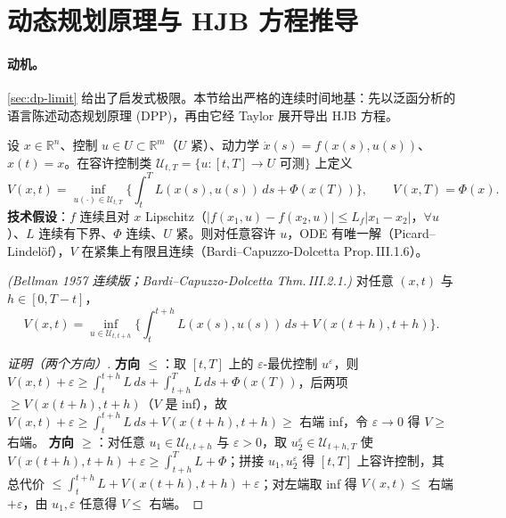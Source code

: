 \section{动态规划原理与 HJB 方程推导}
\label{sec:dp-hjb-derive}

\paragraph{动机。}
\cref{sec:dp-limit} 给出了启发式极限。本节给出严格的连续时间地基：先以泛函分析的语言陈述动态规划原理 (DPP)，再由它经 Taylor 展开导出 HJB 方程。

\begin{definition}\label{def:dp-bolza}
设 $x\in\mathbb R^n$、控制 $u\in U\subset\mathbb R^m$（$U$ 紧）、动力学 $\dot x(s)=f(x(s),u(s))$、$x(t)=x$。在容许控制类 $\mathcal U_{t,T}=\{u:[t,T]\to U\text{ 可测}\}$ 上定义
\begin{equation}
  V(x,t)=\inf_{u(\cdot)\in\mathcal U_{t,T}}\Big\{\int_t^T L(x(s),u(s))\,ds+\Phi(x(T))\Big\},\qquad V(x,T)=\Phi(x).
  \label{eq:dp-bolza}
\end{equation}
\textbf{技术假设}：$f$ 连续且对 $x$ Lipschitz（$|f(x_1,u)-f(x_2,u)|\le L_f|x_1-x_2|$，$\forall u$）、$L$ 连续有下界、$\Phi$ 连续、$U$ 紧。则对任意容许 $u$，ODE 有唯一解（Picard--Lindelöf），$V$ 在紧集上有限且连续（Bardi--Capuzzo-Dolcetta Prop.\,III.1.6\cite{bardi1997optimal}）。
\end{definition}

\begin{theorem}\label{thm:dp-dpp}
\emph{(Bellman 1957 连续版；Bardi--Capuzzo-Dolcetta Thm.\,III.2.1\cite{bardi1997optimal}.)} 对任意 $(x,t)$ 与 $h\in[0,T-t]$，
\begin{equation}
  V(x,t)=\inf_{u\in\mathcal U_{t,t+h}}\Big\{\int_t^{t+h}L(x(s),u(s))\,ds+V(x(t+h),t+h)\Big\}.
  \label{eq:dp-dpp}
\end{equation}
\end{theorem}

\begin{proof}[证明（两个方向）]
\textbf{方向 $\le$}：取 $[t,T]$ 上的 $\varepsilon$-最优控制 $u^\varepsilon$，则 $V(x,t)+\varepsilon\ge\int_t^{t+h}L\,ds+\int_{t+h}^T L\,ds+\Phi(x(T))$，后两项 $\ge V(x(t+h),t+h)$（$V$ 是 inf），故 $V(x,t)+\varepsilon\ge\int_t^{t+h}L\,ds+V(x(t+h),t+h)\ge$ 右端 inf，令 $\varepsilon\to0$ 得 $V\ge$ 右端。
\textbf{方向 $\ge$}：对任意 $u_1\in\mathcal U_{t,t+h}$ 与 $\varepsilon>0$，取 $u_2^\varepsilon\in\mathcal U_{t+h,T}$ 使 $V(x(t+h),t+h)+\varepsilon\ge\int_{t+h}^T L+\Phi$；拼接 $u_1,u_2^\varepsilon$ 得 $[t,T]$ 上容许控制，其总代价 $\le\int_t^{t+h}L+V(x(t+h),t+h)+\varepsilon$；对左端取 inf 得 $V(x,t)\le$ 右端 $+\varepsilon$，由 $u_1,\varepsilon$ 任意得 $V\le$ 右端。
\end{proof}

